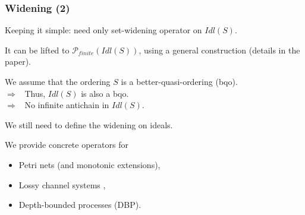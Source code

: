 \documentclass{beamer}
\begin{document}
\begin{frame}
  \frametitle{Widening (2)}

  Keeping it simple: need only \alert{set-widening operator on $\mathit{Idl}(S)$}.
  
  It can be lifted to $\mathcal{P}_{finite}(Idl(S))$, using a general construction (details in the paper).

  \vspace{1ex}
  
  We assume that the ordering $S$ is a \alert{better-quasi-ordering} (bqo).\\
  $\Rightarrow$~ Thus, $\mathit{Idl}(S)$ is also a bqo.\\
  $\Rightarrow$~ No infinite antichain in $\mathit{Idl}(S)$.

  \vspace{1ex}
  
  We still need to define the widening on ideals.

  \vspace{1ex}

  We provide concrete operators for
  \begin{itemize}
  \item Petri nets (and monotonic extensions),
  \item Lossy channel systems \cite{DBLP:conf/lics/AbdullaJ93},
  \item Depth-bounded processes (DBP).
  \end{itemize}

\end{frame}
\end{document}
